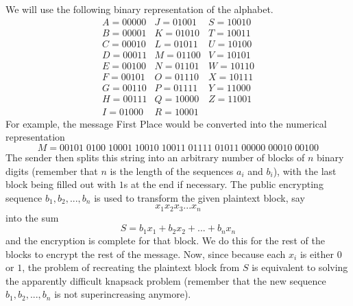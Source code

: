 \documentclass{article}
\newcounter{example}[section]
\begin{document}
We will use the following binary representation of the alphabet. 
\begin{equation}
  \begin{array}{ccc}
      A = 00000 & J = 01001 & S = 10010 \\
      B = 00001 & K = 01010 & T = 10011 \\
      C = 00010 & L = 01011 & U = 10100 \\
      D = 00011 & M = 01100 & V = 10101 \\
      E = 00100 & N = 01101 & W = 10110 \\
      F = 00101 & O = 01110 & X = 10111 \\
      G = 00110 & P = 01111 & Y = 11000 \\
      H = 00111 & Q = 10000 & Z = 11001 \\
      I = 01000 & R = 10001
  \end{array}
\end{equation}
For example, the message First Place would be converted into the numerical representation 
\begin{equation}
  M = 00101\;0100\;10001\;10010\;10011\;01111\;01011\;00000\;00010\;00100
\end{equation}
The sender then splits this string into an arbitrary number of blocks of $n$ binary digits (remember that $n$ is the length of the sequences $a_i$ and $b_i$), with the last block being filled out with $1$s at the end if necessary. The public encrypting sequence $b_1, b_2, ..., b_n$ is used to transform the given plaintext block, say 
\begin{equation}
  x_1 x_2 x_3 ... x_n
\end{equation}
into the sum 
\begin{equation}
  S = b_1 x_1 + b_2 x_2 + ... + b_n x_n
\end{equation}
and the encryption is complete for that block. We do this for the rest of the blocks to encrypt the rest of the message. Now, since because each $x_i$ is either $0$ or $1$, the problem of recreating the plaintext block from $S$ is equivalent to solving the apparently difficult knapsack problem (remember that the new sequence $b_1, b_2, ..., b_n$ is not superincreasing anymore). 
\end{document}
